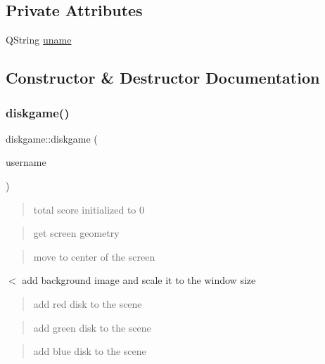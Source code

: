 \subsection*{Private Attributes}
\begin{DoxyCompactItemize}
\item 
Q\+String \hyperlink{classdiskgame_a47f5492c986cd8598c110788e389e32f}{uname}
\end{DoxyCompactItemize}


\subsection{Constructor \& Destructor Documentation}
\mbox{\label{classdiskgame_a2cfbe0d32817697867faf096d5770a0d}} 
\subsubsection{\texorpdfstring{diskgame()}{diskgame()}}
{\footnotesize\ttfamily diskgame\+::diskgame (\begin{DoxyParamCaption}\item[{Q\+String \&}]{username }\end{DoxyParamCaption})}



\begin{quote}
total score initialized to 0 \end{quote}


\begin{quote}
get screen geometry \end{quote}


\begin{quote}
move to center of the screen \end{quote}


$<$ add background image and scale it to the window size

\begin{quote}
add red disk to the scene \end{quote}


\begin{quote}
add green disk to the scene \end{quote}


\begin{quote}
add blue disk to the scene \end{quote}


